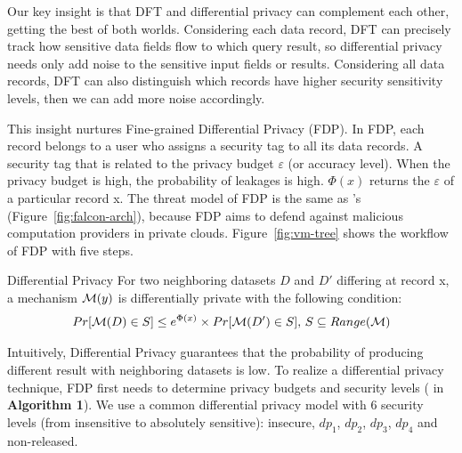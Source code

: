 \begin{figure}[!htb]
\begin{minipage}{0.54\textwidth}
      
      
      
    \vspace{-.1in}


\end{minipage}
    \vspace{-.1in}
\end{figure}

Our key insight is that DFT and differential privacy can complement each other, 
getting the best of both worlds. Considering each data record, DFT can 
precisely track how sensitive data fields flow to which query result, so 
differential privacy needs only add noise to the sensitive input fields or 
results. Considering all data records, DFT can also distinguish which records 
have higher security sensitivity levels, then we can add more noise accordingly.

This insight nurtures Fine-grained Differential Privacy (FDP). In FDP, each 
record belongs to a user who assigns a security tag to all its data records.
A security tag that is related to the privacy budget $\varepsilon$ (or accuracy 
level). When the privacy budget is high, the probability of leakages is high.
$\Phi(x)$ returns the $\varepsilon$ of a particular 
record x. The threat model of FDP is the same as \kakute's 
(Figure~\ref{fig:falcon-arch}), because FDP aims to defend against malicious 
computation providers in private clouds. Figure~\ref{fig:vm-tree} shows the 
workflow of FDP with five steps.

\begin{definition}{Differential Privacy}
For two neighboring datasets $D$ and $D'$ differing at record x,
a mechanism ${\cal M}(y)$ is differentially private with the following  
condition:
\begin{align}
Pr[{\cal M}(D) \in S] \leq e^{\Phi(x)} \times Pr[{\cal M}(D') \in 
S],\,S\subseteq Range({\cal M})
\end{align}
\end{definition}



Intuitively, Differential Privacy guarantees that the probability of
producing different result with neighboring datasets is low. To realize a 
differential privacy technique, FDP first needs to determine privacy budgets 
and security levels ( in \textbf{Algorithm 1}). We use a common 
differential privacy model with 6 security levels (from insensitive 
to absolutely sensitive): insecure, $dp_1$, $dp_2$, $dp_3$, $dp_4$ and 
non-released.

